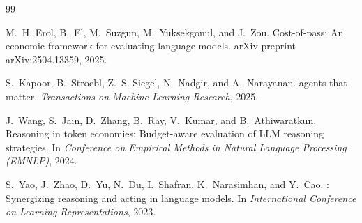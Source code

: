 \documentclass[11pt]{article}
\begin{document}
\begin{thebibliography}{99}

M.~H. Erol, B.~El, M.~Suzgun, M.~Yuksekgonul, and J.~Zou.
\newblock Cost-of-pass: An economic framework for evaluating language models.
\newblock arXiv preprint arXiv:2504.13359, 2025.

S.~Kapoor, B.~Stroebl, Z.~S. Siegel, N.~Nadgir, and A.~Narayanan.
 agents that matter.
\newblock \emph{Transactions on Machine Learning Research}, 2025.

J.~Wang, S.~Jain, D.~Zhang, B.~Ray, V.~Kumar, and B.~Athiwaratkun.
\newblock Reasoning in token economies: Budget-aware evaluation of {LLM} reasoning strategies.
\newblock In \emph{Conference on Empirical Methods in Natural Language Processing (EMNLP)}, 2024.

S.~Yao, J.~Zhao, D.~Yu, N.~Du, I.~Shafran, K.~Narasimhan, and Y.~Cao.
: Synergizing reasoning and acting in language models.
\newblock In \emph{International Conference on Learning Representations}, 2023.

\end{thebibliography}
\end{document}
